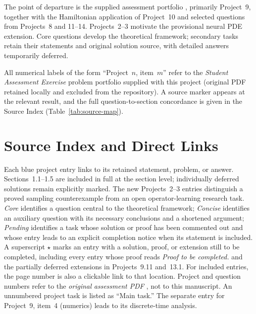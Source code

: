 \documentclass[12pt,a4paper,oneside]{book}
\begin{document}
The point of departure is the supplied assessment portfolio \cite{assessment}, primarily Project~9, together with the
Hamiltonian application of Project~10 and selected questions from Projects~8 and 11--14.
Projects~2--3 motivate the provisional neural PDE extension. Core questions develop the theoretical framework; secondary tasks retain their statements and original solution source, with detailed answers temporarily deferred.


All numerical labels of the form ``Project~$n$, item~$m$'' refer to the \emph{Student Assessment Exercise} problem portfolio
supplied with this project \cite{assessment} (original PDF retained locally and excluded from the repository). A source marker appears at the
relevant result, and the full question-to-section concordance is given in the Source Index (Table~\ref{tab:source-map}).

\chapter*{Source Index and Direct Links}
\label{ch:source-index}

Each blue project entry links to its retained statement, problem, or answer. Sections~1.1--1.5 are included in full at the section level; individually deferred solutions remain explicitly marked. The new Projects~2--3 entries distinguish a proved sampling counterexample from an open operator-learning research task. \emph{Core} identifies a question central to the theoretical framework; \emph{Concise} identifies an auxiliary question with its necessary conclusions and a shortened argument; \emph{Pending} identifies a task whose solution or proof has been commented out and whose entry leads to an explicit completion notice when its statement is included.
A superscript $\star$ marks an entry with a solution, proof, or extension still to be completed, including every entry whose proof reads \emph{Proof to be completed.} and the partially deferred extensions in Projects~9.11 and~13.1.
 For included entries, the page number is also a clickable link to that location. Project and question numbers refer to the \emph{original assessment PDF}
\cite{assessment}, not to this manuscript. An unnumbered project task is listed as ``Main task.'' The separate entry for
Project~9, item~4 (numerics) leads to its discrete-time analysis.
\end{document}
